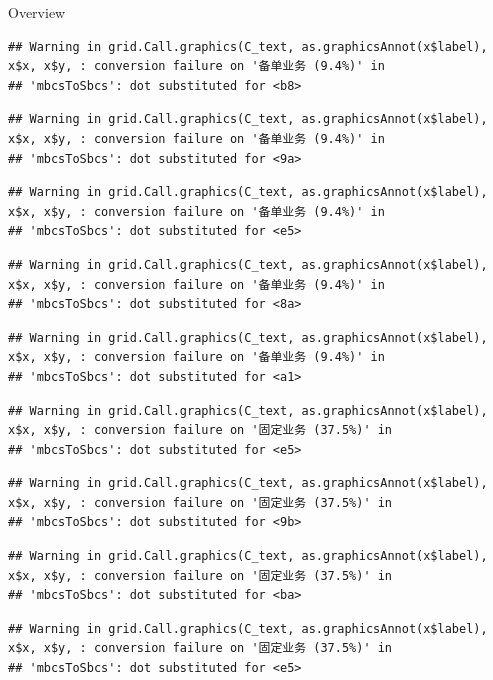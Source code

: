 \documentclass[
  5pt,
  ignorenonframetext,
]{beamer}
\begin{document}
\begin{frame}[fragile]{Overview}
\begin{verbatim}
## Warning in grid.Call.graphics(C_text, as.graphicsAnnot(x$label), x$x, x$y, : conversion failure on '备单业务 (9.4%)' in
## 'mbcsToSbcs': dot substituted for <b8>
\end{verbatim}

\begin{verbatim}
## Warning in grid.Call.graphics(C_text, as.graphicsAnnot(x$label), x$x, x$y, : conversion failure on '备单业务 (9.4%)' in
## 'mbcsToSbcs': dot substituted for <9a>
\end{verbatim}

\begin{verbatim}
## Warning in grid.Call.graphics(C_text, as.graphicsAnnot(x$label), x$x, x$y, : conversion failure on '备单业务 (9.4%)' in
## 'mbcsToSbcs': dot substituted for <e5>
\end{verbatim}

\begin{verbatim}
## Warning in grid.Call.graphics(C_text, as.graphicsAnnot(x$label), x$x, x$y, : conversion failure on '备单业务 (9.4%)' in
## 'mbcsToSbcs': dot substituted for <8a>
\end{verbatim}

\begin{verbatim}
## Warning in grid.Call.graphics(C_text, as.graphicsAnnot(x$label), x$x, x$y, : conversion failure on '备单业务 (9.4%)' in
## 'mbcsToSbcs': dot substituted for <a1>
\end{verbatim}

\begin{verbatim}
## Warning in grid.Call.graphics(C_text, as.graphicsAnnot(x$label), x$x, x$y, : conversion failure on '固定业务 (37.5%)' in
## 'mbcsToSbcs': dot substituted for <e5>
\end{verbatim}

\begin{verbatim}
## Warning in grid.Call.graphics(C_text, as.graphicsAnnot(x$label), x$x, x$y, : conversion failure on '固定业务 (37.5%)' in
## 'mbcsToSbcs': dot substituted for <9b>
\end{verbatim}

\begin{verbatim}
## Warning in grid.Call.graphics(C_text, as.graphicsAnnot(x$label), x$x, x$y, : conversion failure on '固定业务 (37.5%)' in
## 'mbcsToSbcs': dot substituted for <ba>
\end{verbatim}

\begin{verbatim}
## Warning in grid.Call.graphics(C_text, as.graphicsAnnot(x$label), x$x, x$y, : conversion failure on '固定业务 (37.5%)' in
## 'mbcsToSbcs': dot substituted for <e5>
\end{verbatim}


\end{frame}
\end{document}
